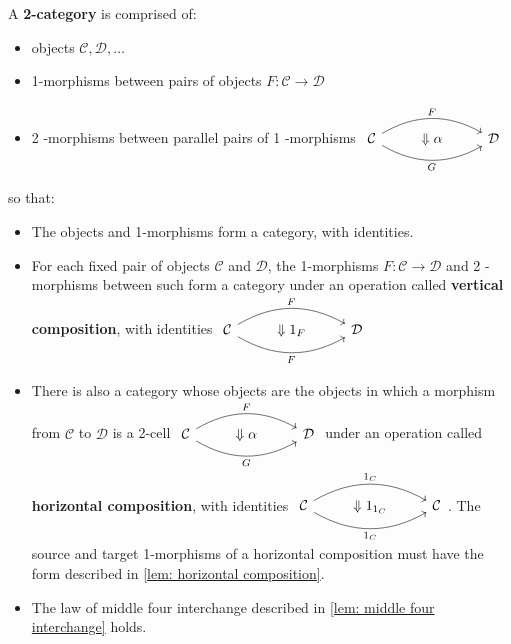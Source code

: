 \documentclass[12pt, oneside]{book}
\begin{document}
\begin{definition}
    A \textbf{2-category} is comprised of:

    \begin{itemize}
        \item
              objects $\mathcal{C},\mathcal{D},\ldots$
        \item
              1-morphisms between pairs of objects $F:\mathcal{C}\to \mathcal{D}$
        \item
              2 -morphisms between parallel pairs of 1 -morphisms $\begin{tikzcd}
                      \mathcal{C} \arrow[rr, "G"', bend right] \arrow[rr, "F", bend left] & \Downarrow \alpha & \mathcal{D}
                  \end{tikzcd}$
    \end{itemize}
    so that:
    \begin{itemize}
        \item
              The objects and 1-morphisms form a category, with identities.
        \item
              For each fixed pair of objects $\mathcal{C}$ and $\mathcal{D}$, the 1-morphisms $F: \mathcal{C} \rightarrow \mathcal{D}$ and 2 -morphisms between such form a category under an operation called \textbf{vertical composition}, with identities $\begin{tikzcd}
                      \mathcal{C} \arrow[rr, "F"', bend right] \arrow[rr, "F", bend left] & \Downarrow 1_F & \mathcal{D}
                  \end{tikzcd}$
        \item
              There is also a category whose objects are the objects in which a morphism from $\mathcal{C}$ to $\mathcal{D}$ is a 2-cell $\begin{tikzcd}
                      \mathcal{C} \arrow[rr, "G"', bend right] \arrow[rr, "F", bend left] & \Downarrow \alpha & \mathcal{D}
                  \end{tikzcd}$ under an operation called \textbf{horizontal composition}, with identities $\begin{tikzcd}
                      \mathcal{C} \arrow[rr, "1_C"', bend right] \arrow[rr, "1_C", bend left] & \Downarrow 1_{1_C} & \mathcal{C}
                  \end{tikzcd}$.
              The source and target 1-morphisms of a horizontal composition must have the form described in \cref{lem: horizontal composition}.
        \item
              The law of middle four interchange described in \cref{lem: middle four interchange} holds.
    \end{itemize}
\end{definition}
\end{document}
